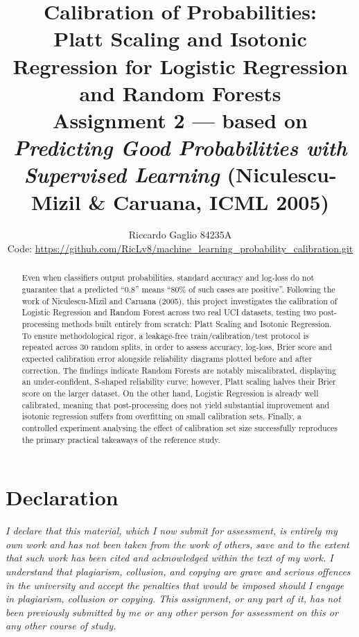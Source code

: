 \documentclass[11pt,a4paper]{article}
\title{\textbf{Calibration of Probabilities:\\ Platt Scaling and Isotonic Regression for Logistic Regression and Random Forests}\\[2pt]
\large Assignment 2 --- based on \emph{Predicting Good Probabilities with Supervised Learning} (Niculescu-Mizil \& Caruana, ICML 2005)}
\author{Riccardo Gaglio \quad 84235A \\ Code: \url{https://github.com/RicLv8/machine_learning_probability_calibration.git}}
\date{}
\begin{document}
\maketitle

\begin{abstract}
\noindent Even when classifiers output probabilities, standard accuracy and log-loss do not guarantee that a predicted ``0.8'' means ``80\% of such cases are positive''. Following the work of Niculescu-Mizil and Caruana (2005), this project investigates the calibration of Logistic Regression and Random Forest across two real UCI datasets, testing two post-processing methods built entirely from scratch: Platt Scaling and Isotonic Regression. To ensure methodological rigor, a leakage-free train/calibration/test protocol is repeated across 30 random splits, in order to assess accuracy, log-loss, Brier score and expected calibration error alongside reliability diagrams plotted before and after correction. The findings indicate Random Forests are notably miscalibrated, displaying an under-confident, S-shaped reliability curve; however, Platt scaling halves their Brier score on the larger dataset. On the other hand, Logistic Regression is already well calibrated, meaning that post-processing does not yield substantial improvement and isotonic regression suffers from overfitting on small calibration sets. Finally, a controlled experiment analysing the effect of calibration set size successfully reproduces the primary practical takeaways of the reference study.
\end{abstract}

\section*{Declaration}
\noindent\textit{I declare that this material, which I now submit for assessment, is entirely my own work and has not been taken from the work of others, save and to the extent that such work has been cited and acknowledged within the text of my work. I understand that plagiarism, collusion, and copying are grave and serious offences in the university and accept the penalties that would be imposed should I engage in plagiarism, collusion or copying. This assignment, or any part of it, has not been previously submitted by me or any other person for assessment on this or any other course of study.}
\end{document}
